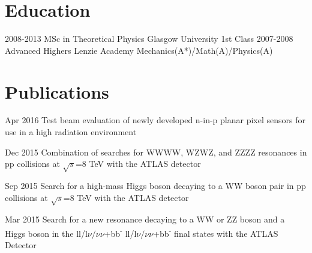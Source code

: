 \documentclass[]{twentysecondcv}
\begin{document}
\section*{Education}

\begin{twenty}
  \twentyitem
    {2008-2013}
    {MSc in Theoretical Physics }
    {Glasgow University}
    {1st Class}
  \twentyitem
    {2007-2008}
    {Advanced Highers}
    {Lenzie Academy}
    {Mechanics(A*)/Math(A)/Physics(A)}
\end{twenty}



\section*{Publications}

\begin{twentyshort}
  \twentyitemshort
    {Apr 2016}
    {Test beam evaluation of newly developed n-in-p planar pixel sensors for use in a high radiation environment}
\end{twentyshort}


\begin{twentyshort}
  \twentyitemshort
    {Dec 2015}
    {Combination of searches for WWWW, WZWZ, and ZZZZ resonances in pp collisions at $\sqrt{s}$=8 TeV with the ATLAS detector}
\end{twentyshort}


\begin{twentyshort}
  \twentyitemshort
    {Sep 2015}
    {Search for a high-mass Higgs boson decaying to a WW boson pair in pp collisions at $\sqrt{s}$=8 TeV with the ATLAS detector  }
\end{twentyshort}


\begin{twentyshort}
  \twentyitemshort
    {Mar 2015}
    {Search for a new resonance decaying to a WW or ZZ boson and a Higgs boson in the ll/l$\nu/\nu\nu$+bb\textsuperscript{-} ll/l$\nu/\nu\nu$+bb\textsuperscript{-} final states with the ATLAS Detector}
\end{twentyshort}
\end{document}

